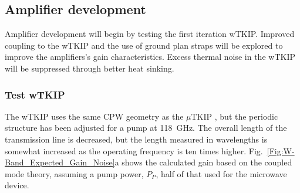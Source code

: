 \subsection{Amplifier development}
Amplifier development will begin by testing the first iteration wTKIP. Improved coupling to the wTKIP and the use of ground plan straps will be explored to improve the amplifiers's gain characteristics. Excess thermal noise in the wTKIP will be suppressed through better heat sinking.

\subsubsection{Test wTKIP}
The wTKIP uses the same CPW geometry as the $\mu$TKIP \cite{Eom2012}, but the periodic structure has been adjusted for a pump at \SI{118}{GHz}. The overall length of the transmission line is decreased, but the length measured in wavelengths is somewhat increased as the operating frequency is ten times higher. Fig.~\ref{Fig:W-Band_Expected_Gain_Noise}a shows the calculated gain based on the coupled mode theory, assuming a pump power, $P_P$, half of that used for the microwave device.

